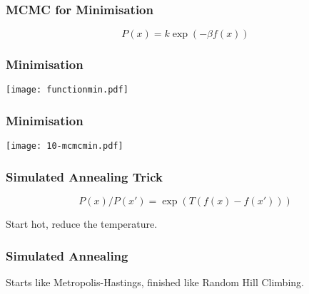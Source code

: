 \begin{frame}[fragile]
\frametitle{MCMC for Minimisation}

\[
P(x) = k \exp(-\beta f(x))
\]


\end{frame}

\begin{frame}[fragile]
\frametitle{Minimisation}

\centering
\texttt{[image: functionmin.pdf]}

\end{frame}

\begin{frame}[fragile]
\frametitle{Minimisation}

\centering
\texttt{[image: 10-mcmcmin.pdf]}

\end{frame}

\begin{frame}[fragile]
\frametitle{Simulated Annealing Trick}

\[
P(x)/P(x') = \exp\left( T (f(x) - f(x')) \right)
\]
\pause

Start hot, reduce the temperature.
\end{frame}

\begin{frame}[fragile]
\frametitle{Simulated Annealing}

Starts like Metropolis-Hastings, finished like Random Hill Climbing.

\end{frame}



